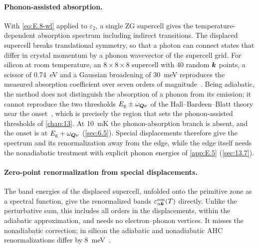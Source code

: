 \paragraph{Phonon-assisted absorption.} With \cref{eq:E.8-wl} applied to $\varepsilon_2$, a single ZG supercell gives the temperature-dependent absorption spectrum including indirect transitions. The displaced supercell breaks translational symmetry, so that a photon can connect states that differ in crystal momentum by a phonon wavevector of the supercell grid. For silicon at room temperature, an $8\times8\times8$ supercell with 40 random $\bm{k}$ points, a scissor of \SI{0.74}{eV} and a Gaussian broadening of \SI{30}{meV} reproduces the measured absorption coefficient over seven orders of magnitude~\cite[Sect.~II and~VII]{zacharias2016one}. Being adiabatic, the method does not distinguish the absorption of a phonon from its emission; it cannot reproduce the two thresholds $E_{\mathrm{g}} \pm \omega_{\bm{Q}\nu}$ of the Hall--Bardeen--Blatt theory near the onset~\cite[Sect.~II]{zacharias2016one}, which is precisely the region that sets the phonon-assisted thresholds of \cref{chap:13}. At \SI{10}{mK} the phonon-absorption branch is absent, and the onset is at $E_{\mathrm{g}} + \omega_{\bm{Q}\nu}$ (\cref{sec:6.5}). Special displacements therefore give the spectrum and its renormalization away from the edge, while the edge itself needs the nonadiabatic treatment with explicit phonon energies of \cref{app:E.5} (\cref{sec:13.7}).

\paragraph{Zero-point renormalization from special displacements.} The band energies of the displaced supercell, unfolded onto the primitive zone as a spectral function, give the renormalized bands $\varepsilon^{\mathrm{ren}}_{n\bm{k}}(T)$ directly. Unlike the perturbative sum, this includes all orders in the displacements, within the adiabatic approximation, and needs no electron--phonon vertices. It misses the nonadiabatic correction; in silicon the adiabatic and nonadiabatic AHC renormalizations differ by \SI{8}{meV}~\cite[Table~VI]{ponce2015temperature}.

